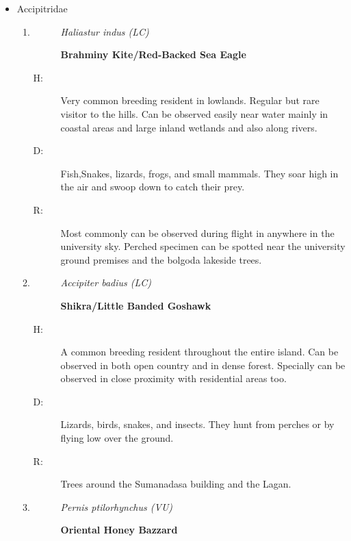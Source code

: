 \begin{itemize}%
\item%
 Accipitridae%
\begin{enumerate}%
\item%
\begin{description}%
\item[]%
\textit{Haliastur indus (LC)}%
\item[]%
\textbf{Brahminy Kite/Red{-}Backed Sea Eagle}%
\end{description}%
\begin{description}%
\item[H: ]%
Very common breeding resident in lowlands. Regular but rare visitor to the hills. Can be observed easily near water mainly in coastal areas and large inland wetlands and also along rivers.%
\item[D: ]%
Fish,Snakes, lizards, frogs, and small mammals. They soar high in the air and swoop down to catch their prey.%
\item[R: ]%
Most commonly can  be observed during flight in anywhere in the university sky. Perched specimen can be spotted near the university ground premises and the bolgoda lakeside trees.%
\end{description}%
\item%
\begin{description}%
\item[]%
\textit{Accipiter badius (LC)}%
\item[]%
\textbf{Shikra/Little Banded Goshawk}%
\end{description}%
\begin{description}%
\item[H: ]%
A common breeding resident throughout the entire island. Can be observed in both open country and in dense forest. Specially can be observed in close proximity with residential areas too.%
\item[D: ]%
 Lizards, birds, snakes, and insects. They hunt from perches or by flying low over the ground.%
\item[R: ]%
Trees around the Sumanadasa building and the Lagan.%
\end{description}%
\item%
\begin{description}%
\item[]%
\textit{Pernis ptilorhynchus (VU)}%
\item[]%
\textbf{Oriental Honey Bazzard}%
\end{description}%
\begin{description}%

\end{description}
\end{enumerate}
\end{itemize}
